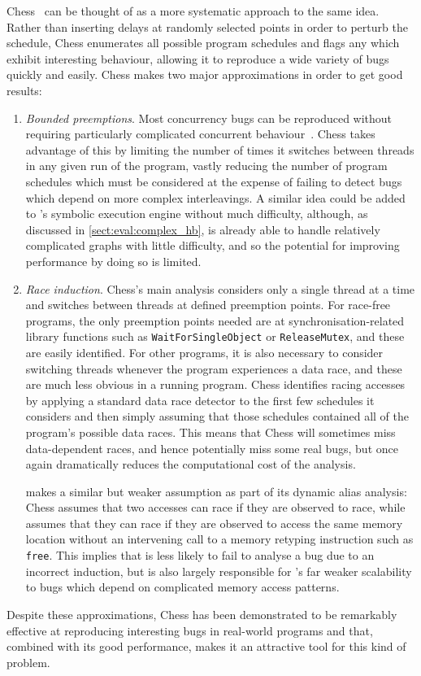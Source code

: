 Chess~\cite{Musuvathi2008} can be thought of as a more systematic
approach to the same idea.  Rather than inserting delays at randomly
selected points in order to perturb the schedule, Chess enumerates all
possible program schedules and flags any which exhibit interesting
behaviour, allowing it to reproduce a wide variety of bugs quickly and
easily.  Chess makes two major approximations in order to get good
results:
\begin{enumerate}
\item \emph{Bounded preemptions}. Most concurrency bugs can be
  reproduced without requiring particularly complicated concurrent
  behaviour~\cite{Musuvathi2007}.  Chess takes advantage of this by
  limiting the number of times it switches between threads in any
  given run of the program, vastly reducing the number of program
  schedules which must be considered at the expense of failing to
  detect bugs which depend on more complex interleavings.  A similar
  idea could be added to {\technique}'s symbolic execution engine
  without much difficulty, although, as discussed in
  \autoref{sect:eval:complex_hb}, {\technique} is already able to
  handle relatively complicated graphs with little difficulty, and so
  the potential for improving performance by doing so is limited.
\item \emph{Race induction}. Chess's main analysis considers only a
  single thread at a time and switches between threads at defined
  preemption points.  For race-free programs, the only preemption
  points needed are at synchronisation-related library functions such
  as \texttt{WaitForSingleObject} or \texttt{ReleaseMutex}, and these
  are easily identified.  For other programs, it is also necessary to
  consider switching threads whenever the program experiences a data
  race, and these are much less obvious in a running program.  Chess
  identifies racing accesses by applying a standard data race detector
  to the first few schedules it considers and then simply assuming
  that those schedules contained all of the program's possible data
  races.  This means that Chess will sometimes miss data-dependent
  races, and hence potentially miss some real bugs, but once again
  dramatically reduces the computational cost of the analysis.

  {\Technique} makes a similar but weaker assumption as part of its
  dynamic alias analysis: Chess assumes that two accesses can race if
  they are observed to race, while {\technique} assumes that they can
  race if they are observed to access the same memory location without
  an intervening call to a memory retyping instruction such as
  \texttt{free}.  This implies that {\technique} is less likely to
  fail to analyse a bug due to an incorrect induction, but is also
  largely responsible for {\technique}'s far weaker scalability to
  bugs which depend on complicated memory access patterns.
\end{enumerate}
Despite these approximations, Chess has been demonstrated to be
remarkably effective at reproducing interesting bugs in real-world
programs and that, combined with its good performance, makes it an
attractive tool for this kind of problem.

